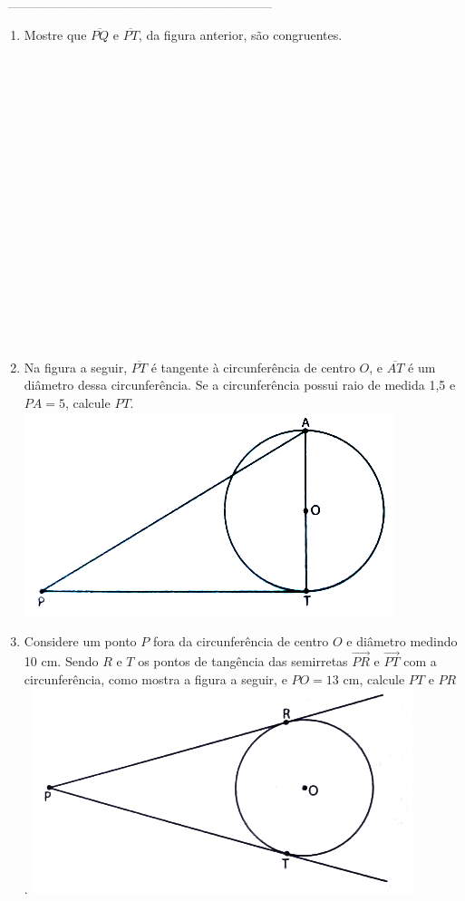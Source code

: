 \documentclass[a4paper,14pt]{article}
\begin{document}
\begin{multicols}{2}
    	\noindent\textsubscript{~---------------------------------------------------------------------------}
    	\begin{enumerate}
    		\item Mostre que $\overline{PQ}$ e $\overline{PT}$, da figura anterior, são congruentes. \\\\\\\\\\\\\\\\\\\\\\\\\\\\\\\\\\\\
    		\item Na figura a seguir, $\overline{PT}$ é tangente à circunferência de centro $O$, e $\overline{AT}$ é um diâmetro dessa circunferência. Se a circunferência possui raio de medida 1,5 e $PA = 5$, calcule $PT$. \includegraphics[width=1\linewidth]{imagens_8FMA108/imagem2}
    		 \newpage
    		\item Considere um ponto $P$ fora da circunferência de centro $O$ e diâmetro medindo 10 cm. Sendo $R$ e $T$ os pontos de tangência das semirretas $\stackrel{\longrightarrow}{PR}$ e $\stackrel{\longrightarrow}{PT}$ com a circunferência, como mostra a figura a seguir, e $PO = 13$ cm, calcule $PT$ e $PR$. \includegraphics[width=1\linewidth]{imagens_8FMA108/imagem3} \columnbreak
    		

\end{enumerate}
\end{multicols}
\end{document}
